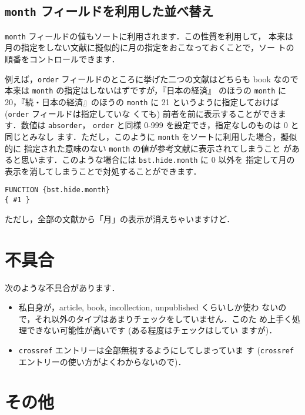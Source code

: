 \documentclass[a4j,10pt]{jarticle}
\begin{document}
\subsection{\texttt{month} フィールドを利用した並べ替え}

\texttt{month} フィールドの値もソートに利用されます．この性質を利用して，
本来は月の指定をしない文献に擬似的に月の指定をおこなっておくことで，ソー
トの順番をコントロールできます．

例えば，\texttt{order} フィールドのところに挙げた二つの文献はどちらも 
book なので本来は \texttt{month} の指定はしないはずですが，『日本の経済』
のほうの \texttt{month} に 20，『続・日本の経済』のほうの \texttt{month} 
に 21 というように指定しておけば(\texttt{order} フィールドは指定していな
くても) 前者を前に表示することができます．数値は \texttt{absorder}，
\texttt{order} と同様 0-999 を設定でき，指定なしのものは 0 と同じとみなし
ます．ただし，このように \texttt{month} をソートに利用した場合，擬似的に
指定された意味のない \texttt{month} の値が参考文献に表示されてしまうこと
があると思います．このような場合には \texttt{bst.hide.month} に 0 以外を
指定して月の表示を消してしまうことで対処することができます．
\begin{screen}
\begin{verbatim}
FUNCTION {bst.hide.month}
{ #1 }
\end{verbatim}
\end{screen}
ただし，全部の文献から「月」の表示が消えちゃいますけど．


\section{不具合}

次のような不具合があります．

\begin{itemize}
 \item 私自身が，article, book, incollection, unpublished くらいしか使わ
       ないので，それ以外のタイプはあまりチェックをしていません．このた
       め上手く処理できない可能性が高いです (ある程度はチェックはしてい
       ますが)．
 \item \texttt{crossref} エントリーは全部無視するようにしてしまっていま
       す (\texttt{crossref} エントリーの使い方がよくわからないので)．
\end{itemize}

\section{その他}
\end{document}
